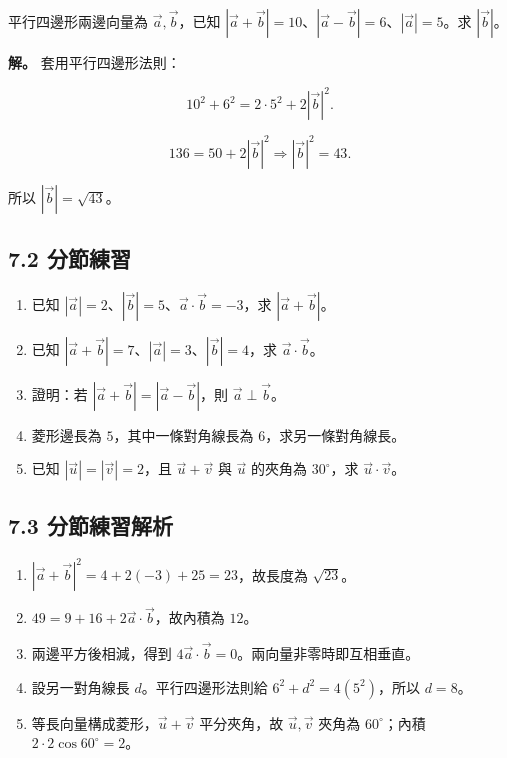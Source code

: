 \documentclass[11pt,a4paper]{article}
\providecommand{\tightlist}{%
  \setlength{\itemsep}{0pt}\setlength{\parskip}{0pt}}
\begin{document}
平行四邊形兩邊向量為 \(\vec a,\vec b\)，已知 \(|\vec a+\vec b|=10\)、\(|\vec a-\vec b|=6\)、\(|\vec a|=5\)。求 \(|\vec b|\)。

\textbf{解。} 套用平行四邊形法則：

\[
10^2+6^2=2\cdot5^2+2|\vec b|^2.
\]

\[
136=50+2|\vec b|^2\Rightarrow |\vec b|^2=43.
\]

所以 \(|\vec b|=\sqrt{43}\)。

\subsection{7.2 分節練習}\label{ux5206ux7bc0ux7df4ux7fd2-6}

\begin{enumerate}
\def\labelenumi{\arabic{enumi}.}
\tightlist
\item
  已知 \(|\vec a|=2\)、\(|\vec b|=5\)、\(\vec a\cdot\vec b=-3\)，求 \(|\vec a+\vec b|\)。
\item
  已知 \(|\vec a+\vec b|=7\)、\(|\vec a|=3\)、\(|\vec b|=4\)，求 \(\vec a\cdot\vec b\)。
\item
  證明：若 \(|\vec a+\vec b|=|\vec a-\vec b|\)，則 \(\vec a\perp\vec b\)。
\item
  菱形邊長為 \(5\)，其中一條對角線長為 \(6\)，求另一條對角線長。
\item
  已知 \(|\vec u|=|\vec v|=2\)，且 \(\vec u+\vec v\) 與 \(\vec u\) 的夾角為 \(30^\circ\)，求 \(\vec u\cdot\vec v\)。
\end{enumerate}

\subsection{7.3 分節練習解析}\label{ux5206ux7bc0ux7df4ux7fd2ux89e3ux6790-6}

\begin{enumerate}
\def\labelenumi{\arabic{enumi}.}
\tightlist
\item
  \(|\vec a+\vec b|^2=4+2(-3)+25=23\)，故長度為 \(\sqrt{23}\)。
\item
  \(49=9+16+2\vec a\cdot\vec b\)，故內積為 \(12\)。
\item
  兩邊平方後相減，得到 \(4\vec a\cdot\vec b=0\)。兩向量非零時即互相垂直。
\item
  設另一對角線長 \(d\)。平行四邊形法則給 \(6^2+d^2=4(5^2)\)，所以 \(d=8\)。
\item
  等長向量構成菱形，\(\vec u+\vec v\) 平分夾角，故 \(\vec u,\vec v\) 夾角為 \(60^\circ\)；內積 \(2\cdot2\cos60^\circ=2\)。
\end{enumerate}
\end{document}
